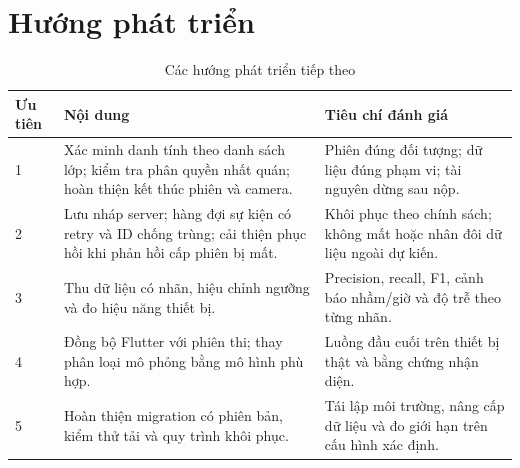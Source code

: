 \section{Hướng phát triển}
\begin{longtable}{@{}L{1.3cm}L{6.2cm}L{7.1cm}@{}}
\caption{Các hướng phát triển tiếp theo}\\
\toprule Ưu tiên & Nội dung & Tiêu chí đánh giá \\\midrule{} & Xác minh danh tính theo danh sách lớp; kiểm tra phân quyền nhất quán; hoàn thiện kết thúc phiên và camera. & Phiên đúng đối tượng; dữ liệu đúng phạm vi; tài nguyên dừng sau nộp.\\
2 & Lưu nháp server; hàng đợi sự kiện có retry và ID chống trùng; cải thiện phục hồi khi phản hồi cấp phiên bị mất. & Khôi phục theo chính sách; không mất hoặc nhân đôi dữ liệu ngoài dự kiến.\\
3 & Thu dữ liệu có nhãn, hiệu chỉnh ngưỡng và đo hiệu năng thiết bị. & Precision, recall, F1, cảnh báo nhầm/giờ và độ trễ theo từng nhãn.\\
4 & Đồng bộ Flutter với phiên thi; thay phân loại mô phỏng bằng mô hình phù hợp. & Luồng đầu cuối trên thiết bị thật và bằng chứng nhận diện.\\
5 & Hoàn thiện migration có phiên bản, kiểm thử tải và quy trình khôi phục. & Tái lập môi trường, nâng cấp dữ liệu và đo giới hạn trên cấu hình xác định.\\
\bottomrule
\end{longtable}

